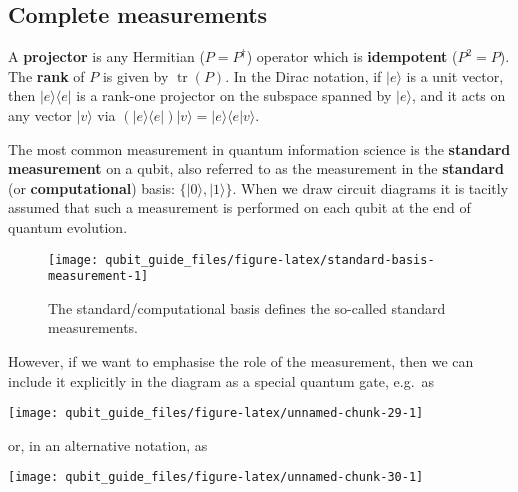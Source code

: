 \documentclass[fleqn]{article}
\newenvironment{idea}{\noindent}{\medskip}
\begin{document}
\hypertarget{complete-measurements}{%
\subsection{Complete measurements}\label{complete-measurements}}

\begin{idea}
A \textbf{projector} is any Hermitian (\(P=P^\dagger\)) operator which is \textbf{idempotent} (\(P^2=P\)).
The \textbf{rank} of \(P\) is given by \(\operatorname{tr}(P)\).
In the Dirac notation, if \(|e\rangle\) is a unit vector, then \(|e\rangle\langle e|\) is a rank-one projector on the subspace spanned by \(|e\rangle\), and it acts on any vector \(|v\rangle\) via \((|e\rangle\langle e|)|v\rangle = |e\rangle\langle e|v\rangle\).

\end{idea}

The most common measurement in quantum information science is the \textbf{standard measurement} on a qubit, also referred to as the measurement in the \textbf{standard} (or \textbf{computational}) basis: \(\{|0\rangle,|1\rangle\}\).
When we draw circuit diagrams it is tacitly assumed that such a measurement is performed on each qubit at the end of quantum evolution.

\begin{figure}[H]

{\centering \texttt{[image: qubit\_guide\_files/figure-latex/standard-basis-measurement-1]} 

}

\caption{The standard/computational basis defines the so-called standard measurements.}\label{fig:standard-basis-measurement}
\end{figure}

However, if we want to emphasise the role of the measurement, then we can include it explicitly in the diagram as a special quantum gate, e.g.~as

\begin{center}\texttt{[image: qubit\_guide\_files/figure-latex/unnamed-chunk-29-1]} \end{center}

or, in an alternative notation, as

\begin{center}\texttt{[image: qubit\_guide\_files/figure-latex/unnamed-chunk-30-1]} \end{center}
\end{document}
